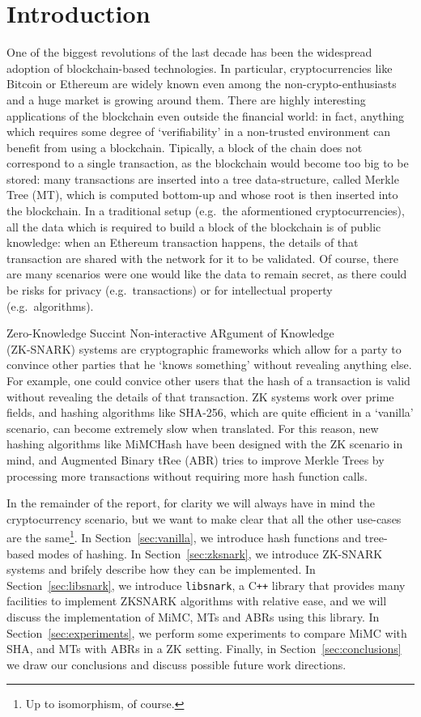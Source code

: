 \section{Introduction}
One of the biggest revolutions of the last decade has been the widespread adoption of
blockchain-based technologies. In particular, cryptocurrencies like Bitcoin or Ethereum are
widely known even among the non-crypto-enthusiasts and a huge market is growing around them.
There are highly interesting applications of the blockchain even outside the financial world:
in fact, anything which requires some degree of `verifiability' in a non-trusted environment can
benefit from using a blockchain.
Tipically, a block of the chain does not correspond to a single transaction, as the blockchain
would become too big to be stored: many transactions are inserted into a tree data-structure,
called Merkle Tree (MT), which is computed bottom-up and whose root is then inserted into the blockchain.
In a traditional setup (e.g.\ the aformentioned cryptocurrencies), all the data which is required
to build a block of the blockchain is of public knowledge: when an Ethereum transaction happens,
the details of that transaction are shared with the network for it to be validated.
Of course, there are many scenarios were one would like the data to remain secret, as there could
be risks for privacy (e.g.\ transactions) or for intellectual property (e.g.\ algorithms).

Zero-Knowledge Succint Non-interactive ARgument of Knowledge\\ (ZK-SNARK) systems are cryptographic
frameworks which allow for a party to convince other parties that he `knows something' without
revealing anything else.
For example, one could convice other users that the hash of a transaction is valid without
revealing the details of that transaction.
ZK systems work over prime fields, and hashing algorithms like SHA-256, which are quite efficient
in a `vanilla' scenario, can become extremely slow when translated.
For this reason, new hashing algorithms like MiMCHash have been designed with the ZK scenario in
mind, and Augmented Binary tRee (ABR) tries to improve Merkle Trees by processing more transactions
without requiring more hash function calls.

In the remainder of the report, for clarity we will always have in mind the cryptocurrency scenario,
but we want to make clear that all the other use-cases are the same\footnote[1]{Up to isomorphism, of
	course.}.
In Section~\ref{sec:vanilla}, we introduce hash functions and tree-based modes of hashing.
In Section~\ref{sec:zksnark}, we introduce ZK-SNARK systems and brifely describe how they can be
implemented.
In Section~\ref{sec:libsnark}, we introduce \texttt{libsnark}, a C\texttt{++} library that provides
many facilities to implement ZKSNARK algorithms with relative ease, and we will discuss the
implementation of MiMC, MTs and ABRs using this library.
In Section~\ref{sec:experiments}, we perform some experiments to compare MiMC with SHA, and MTs
with ABRs in a ZK setting.
Finally, in Section~\ref{sec:conclusions} we draw our conclusions and discuss possible future work
directions.
